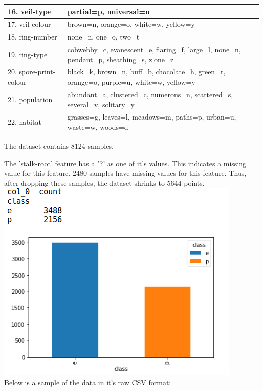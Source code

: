 \documentclass[12pt]{book}
\begin{document}
\begin{center}
\begin{tabularx}{\linewidth}{ |l|X| }
\hline
 16. veil-type & partial=p, universal=u \\ \hline 17. veil-colour & brown=n, orange=o, white=w, yellow=y \\ \hline 18. ring-number & none=n, one=o, two=t \\
 \hline
 19. ring-type & cobwebby=c, evanescent=e, flaring=f, large=l, none=n, pendant=p, sheathing=s, z one=z \\
 \hline
 20. spore-print-colour & black=k, brown=n, buff=b, chocolate=h, green=r, orange=o, purple=u, white=w, yellow=y \\
 \hline
 21. population & abundant=a, clustered=c, numerous=n, scattered=s, several=v, solitary=y \\ \hline 22. habitat & grasses=g, leaves=l, meadows=m, paths=p, urban=u, waste=w, woods=d \\
\hline
\end{tabularx}
\end{center}

The dataset contains 8124 samples.

The 'stalk-root' feature has a '?' as one of it's values.
This indicates a missing value for this feature.
2480 samples have missing values for this feature.
Thus, after dropping these samples, the dataset shrinks to 5644 points.\\

\includegraphics[scale = 0.75]{EvsP.png}\\[1.0 cm]

Below is a sample of the data in it's raw CSV format:\\
\end{document}
